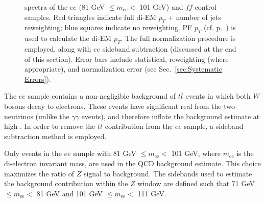 \documentclass[dissertation.tex]{subfiles}
\begin{document}
\begin{figure}
	\hspace{1cm}
	\caption{\MET spectra of the $ee$ (81 GeV $\leq m_{\mathrm{ee}} <$ 101 GeV) and $\mathit{ff}$ control samples.  Red triangles indicate full di-EM $p_{T}$ + number of jets reweighting; blue squares indicate no reweighting.  PF $p_{T}$ (cf. p.~\pageref{fig:ET_bias_vs_EMF}) is used to calculate the di-EM $p_{T}$.  The full normalization procedure is employed, along with $ee$ sideband subtraction (discussed at the end of this section).  Error bars include statistical, reweighting (where appropriate), and normalization error (see Sec.~\ref{sec:Systematic Errors}).}
	\label{fig:reweighting_vs_no_reweighting}
\end{figure}

The $ee$ sample contains a non-negligible background of $t\bar{t}$ events in which both $W$ bosons decay to electrons.  These events have significant real \MET from the two neutrinos (unlike the $\gamma\gamma$ events), and therefore inflate the background estimate at high \MET.  In order to remove the $t\bar{t}$ contribution from the $ee$ sample, a sideband subtraction method is employed.

Only events in the $ee$ sample with 81 GeV $\leq m_{\mathrm{ee}} <$ 101 GeV, where $m_{\mathrm{ee}}$ is the di-electron invariant mass, are used in the QCD background estimate.  This choice maximizes the ratio of $Z$ signal to background.  The sidebands used to estimate the background contribution within the $Z$ window are defined such that 71 GeV $\leq m_{\mathrm{ee}} <$ 81 GeV and 101 GeV $\leq m_{\mathrm{ee}} <$ 111 GeV.
\end{document}

